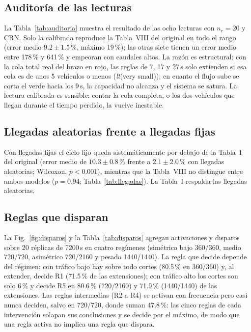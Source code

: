 \documentclass[journal]{IEEEtran}
\begin{document}
\subsection{Auditoría de las lecturas}
\label{sec:auditoria}
La Tabla~\ref{tab:auditoria} muestra el resultado de las ocho lecturas con $n_r=20$ y CRN. Solo la calibrada reproduce la Tabla~VIII del original en todo el rango (error medio $9.2\pm1.5$\,\%, máximo 19\,\%); las otras siete tienen un error medio entre 178\,\% y 641\,\% y empeoran con caudales altos. La razón es estructural: con la cola total real del brazo en rojo, las reglas de 7, 17 y 27\,s solo extienden si esa cola es de unos 5 vehículos o menos (\emph{lt}(very small)); en cuanto el flujo sube se corta el verde hacia los 9\,s, la capacidad no alcanza y el sistema se satura. La lectura calibrada es sensible: contar la cola completa, o los dos vehículos que llegan durante el tiempo perdido, la vuelve inestable.




\subsection{Llegadas aleatorias frente a llegadas fijas}
Con llegadas fijas el ciclo fijo queda sistemáticamente por debajo de la Tabla~I del original (error medio de $10.3\pm0.8$\,\% frente a $2.1\pm2.0$\,\% con llegadas aleatorias; Wilcoxon, $p<0.001$), mientras que la Tabla~VIII no distingue entre ambos modelos ($p=0.94$; Tabla~\ref{tab:llegadas}). La Tabla~I respalda las llegadas aleatorias.



\subsection{Reglas que disparan}
\label{sec:reglas-disparos}
La Fig.~\ref{fig:disparos} y la Tabla~\ref{tab:disparos} agregan activaciones y disparos sobre 20 réplicas de 7200\,s en cuatro regímenes (simétrico bajo 360/360, medio 720/720, asimétrico 720/2160 y pesado 1440/1440). La regla que decide depende del régimen: con tráfico bajo hay sobre todo cortes (80.5\,\% en 360/360) y, al extender, decide R1 (71.5\,\% de las extensiones); con tráfico alto los cortes son solo 6\,\% y decide R5 en 80.6\,\% (720/2160) y 71.9\,\% (1440/1440) de las extensiones. Las reglas intermedias (R2 a R4) se activan con frecuencia pero casi nunca deciden, salvo en 720/720, donde suman 47.8\,\%: las cinco reglas de cada intervención solapan sus conclusiones y se decide por el máximo, de modo que una regla activa no implica una regla que dispara.
\end{document}
